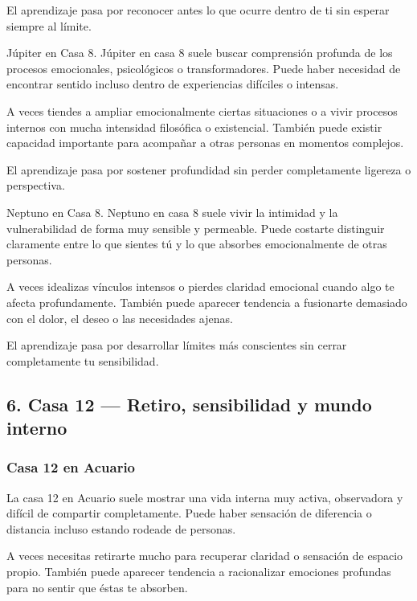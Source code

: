 \documentclass[11pt,a4paper]{article}
\begin{document}
El aprendizaje pasa por reconocer antes lo que ocurre dentro de ti sin esperar siempre al límite.

Júpiter en Casa 8.
Júpiter en casa 8 suele buscar comprensión profunda de los procesos emocionales, psicológicos o transformadores. Puede haber necesidad de encontrar sentido incluso dentro de experiencias difíciles o intensas.

A veces tiendes a ampliar emocionalmente ciertas situaciones o a vivir procesos internos con mucha intensidad filosófica o existencial. También puede existir capacidad importante para acompañar a otras personas en momentos complejos.

El aprendizaje pasa por sostener profundidad sin perder completamente ligereza o perspectiva.

Neptuno en Casa 8.
Neptuno en casa 8 suele vivir la intimidad y la vulnerabilidad de forma muy sensible y permeable. Puede costarte distinguir claramente entre lo que sientes tú y lo que absorbes emocionalmente de otras personas.

A veces idealizas vínculos intensos o pierdes claridad emocional cuando algo te afecta profundamente. También puede aparecer tendencia a fusionarte demasiado con el dolor, el deseo o las necesidades ajenas.

El aprendizaje pasa por desarrollar límites más conscientes sin cerrar completamente tu sensibilidad.

\vspace{0.4cm}

\subsection{6. Casa 12 — Retiro, sensibilidad y mundo interno}

\subsubsection*{Casa 12 en Acuario}

La casa 12 en Acuario suele mostrar una vida interna muy activa, observadora y difícil de compartir completamente. Puede haber sensación de diferencia o distancia incluso estando rodeade de personas.

A veces necesitas retirarte mucho para recuperar claridad o sensación de espacio propio. También puede aparecer tendencia a racionalizar emociones profundas para no sentir que éstas te absorben.
\end{document}
